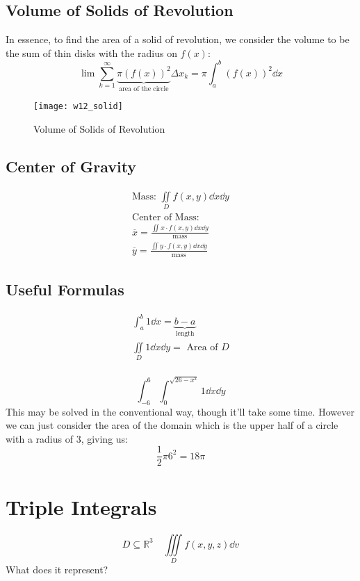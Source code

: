 \documentclass[00_complete]{subfiles}
\begin{document}
\subsection{Volume of Solids of Revolution}

In essence, to find the area of a solid of revolution, we consider the volume
to be the sum of thin disks with the radius on $f(x)$:
$$\lim \sum_{k=1}^{\infty} \underbrace{\pi(f(x))^2}_{\text{area of the
circle}}\Delta x_k=\pi\int_{a}^{b}(f(x))^2\dd{x}$$
    \begin{figure}[ht]
    \centering
    \texttt{[image: w12\_solid]}
    \caption{Volume of Solids of Revolution}
    \end{figure}
\subsection{Center of Gravity}

\begin{gather*}
    \text{Mass: } \iint\limits_D f(x,y)\dd{x}\dd{y} \\
    \text{Center of Mass:} \\
    \overline x = \frac{\iint x\cdot f(x,y)\dd{x}\dd{y}}{\text{mass}} \\
    \overline y = \frac{\iint y\cdot f(x,y)\dd{x}\dd{y}}{\text{mass}}
\end{gather*}
\subsection{Useful Formulas}
\begin{gather*}
    \int_{a}^{b}1\dd{x}=\underbrace{b-a}_{\text{length}} \\
    \iint\limits_D 1\dd{x}\dd{y}=\text{ Area of $D$} \\
\end{gather*}
\begin{example}
    $$\int_{-6}^{6}\int_{0}^{\sqrt{26-x^2}}1\dd{x}\dd{y}$$
    This may be solved in the conventional way, though it'll take some time.
    However we can just consider the area of the domain which is the upper
    half of a circle with a radius of $3$, giving us:
    $$\frac{1}{2}\pi 6^2 = 18\pi$$
\end{example}
\section{Triple Integrals}
$$D \subseteq \mathbb{R}^3 \quad \iiint\limits_Df(x,y,z)\dd{v}$$
What does it represent?
\end{document}

